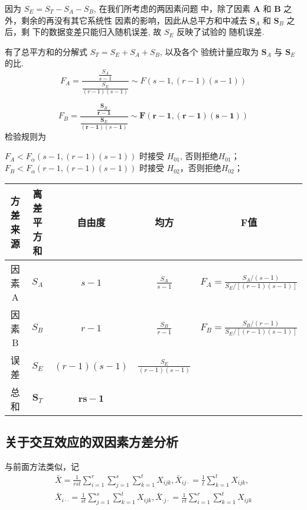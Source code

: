 因为 \( S_{E}=S_{T}-S_{A}-S_{B} \), 在我们所考虑的两因素问题 中，除了因素 \( \boldsymbol{A} \) 和 \( \boldsymbol{B} \) 之外，剩余的再没有其它系统性 因素的影响，因此从总平方和中减去 \( \boldsymbol{S}_{A} \) 和 \( \boldsymbol{S}_{B} \) 之后，剩 下的数据变差只能归入随机误差, 故 \( S_{E} \) 反映了试验的 随机误差. 

有了总平方和的分解式 \( S_{T}=S_{E}+S_{A}+S_{B} \), 以及各个
验统计量应取为 \( \boldsymbol{S}_{A} \) 与 \( \boldsymbol{S}_{E} \) 的比. 
$$
F_{A}=\frac{\frac{S_{A}}{s-1}}{\frac{S_{E}}{(r-1)(s-1)}} \sim F(s-1,(r-1)(s-1))
$$

$$
F_{B}=\frac{\frac{\boldsymbol{S}_{B}}{\boldsymbol{r}-\mathbf{1}}}{\frac{\boldsymbol{S}_{E}}{(\boldsymbol{r}-\mathbf{1})(s-\mathbf{1})}} \sim \boldsymbol{F}(\boldsymbol{r}-\mathbf{1},(\boldsymbol{r}-\mathbf{1})(\boldsymbol{s}-\mathbf{1}))
$$
检验规则为

\( F_{A}<F_{\alpha}(s-1,(r-1)(s-1)) \) 时接受 \( H_{01} \), 否则拒绝\( H_{01} \)；
\( F_{B}<F_{\alpha}(r-1,(r-1)(s-1)) \) 时接受 \( H_{02} \)，否则拒绝\( H_{02} \)；

\begin{table}
   \begin{tabular}{c|c|c|c|c}
    \hline
            方差来源 & 离差平方和 & 自由度 & 均方 & F值 \\
    \hline 因素 A & \( S_{A} \) & \( s-1 \) & \( \frac{S_{A}}{s-1} \) & \( F_{A}=\frac{S_{A} /(s-1)}{S_{E} /[(r-1)(s-1)]} \) \\
    \hline  因素 B & \( S_{B} \) & \( r-1 \) & \( \frac{S_{B}}{r-1} \) & \( F_{B}=\frac{S_{B} /(r-1)}{S_{E} /[(r-1)(s-1)]} \) \\
    \hline 误 差 & \( S_{E} \) & \( (r-1)(s-1) \) & \( \frac{S_{E}}{(r-1)(s-1)} \) & \\
    \hline 总 和 & \( \boldsymbol{S}_{T} \) & \( \boldsymbol{r s}-\mathbf{1} \) & & \\
    \hline
    \end{tabular} 
\end{table}

\subsection{关于交互效应的双因素方差分析}

与前面方法类似，记
$$
\begin{array}{l}
\bar{X}=\frac{1}{r s t} \sum_{i=1}^{r} \sum_{j=1}^{s} \sum_{k=1}^{t} X_{i j k}, \bar{X}_{i j \cdot}=\frac{1}{t} \sum_{k=1}^{t} X_{i j k}, \\
\bar{X}_{i \cdot \cdot}=\frac{1}{s t} \sum_{j=1}^{s} \sum_{k=1}^{t} X_{i j k}, \bar{X}_{\cdot j \cdot}=\frac{1}{r t} \sum_{i=1}^{r} \sum_{k=1}^{t} X_{i j k}
\end{array}
$$

